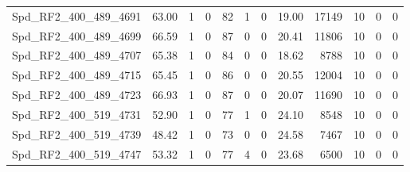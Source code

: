 \begin{longtable}[c]{@{}lrrrrrrrrrrr@{}}
Spd\_RF2\_400\_489\_4691     & 63.00                  & 1                       & 0                       & 82                     & 1                       & 0                       & 19.00                   & 17149                    & 10                       & 0                        & 0                        \\
Spd\_RF2\_400\_489\_4699     & 66.59                  & 1                       & 0                       & 87                     & 0                       & 0                       & 20.41                   & 11806                    & 10                       & 0                        & 0                        \\
Spd\_RF2\_400\_489\_4707     & 65.38                  & 1                       & 0                       & 84                     & 0                       & 0                       & 18.62                   & 8788                     & 10                       & 0                        & 0                        \\
Spd\_RF2\_400\_489\_4715     & 65.45                  & 1                       & 0                       & 86                     & 0                       & 0                       & 20.55                   & 12004                    & 10                       & 0                        & 0                        \\
Spd\_RF2\_400\_489\_4723     & 66.93                  & 1                       & 0                       & 87                     & 0                       & 0                       & 20.07                   & 11690                    & 10                       & 0                        & 0                        \\
Spd\_RF2\_400\_519\_4731     & 52.90                  & 1                       & 0                       & 77                     & 1                       & 0                       & 24.10                   & 8548                     & 10                       & 0                        & 0                        \\
Spd\_RF2\_400\_519\_4739     & 48.42                  & 1                       & 0                       & 73                     & 0                       & 0                       & 24.58                   & 7467                     & 10                       & 0                        & 0                        \\
Spd\_RF2\_400\_519\_4747     & 53.32                  & 1                       & 0                       & 77                     & 4                       & 0                       & 23.68                   & 6500                     & 10                       & 0                        & 0                        \\

\end{longtable}
